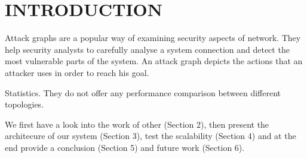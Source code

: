 \section{INTRODUCTION}

Attack graphs are a popular way of examining security aspects of network. They help security analysts to carefully analyse a system connection and detect the most vulnerable parts of the system. An attack graph depicts the actions that an attacker uses in order to reach his goal.  

Statistics. They do not offer any performance comparison between different topologies. 

We first have a look into the work of other (Section 2), then present the architecure of our system (Section 3), test the scalability (Section 4) and at the end provide a conclusion (Section 5) and future work (Section 6).

